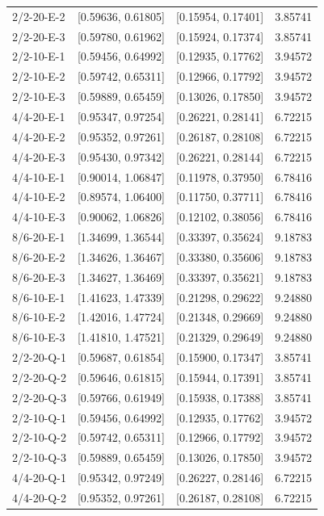 \begin{longtable}{lccr}
2/2-20-E-2 & [0.59636, 0.61805] & [0.15954, 0.17401] & 3.85741 \\
2/2-20-E-3 & [0.59780, 0.61962] & [0.15924, 0.17374] & 3.85741 \\
2/2-10-E-1 & [0.59456, 0.64992] & [0.12935, 0.17762] & 3.94572 \\
2/2-10-E-2 & [0.59742, 0.65311] & [0.12966, 0.17792] & 3.94572 \\
2/2-10-E-3 & [0.59889, 0.65459] & [0.13026, 0.17850] & 3.94572 \\
4/4-20-E-1 & [0.95347, 0.97254] & [0.26221, 0.28141] & 6.72215 \\
4/4-20-E-2 & [0.95352, 0.97261] & [0.26187, 0.28108] & 6.72215 \\
4/4-20-E-3 & [0.95430, 0.97342] & [0.26221, 0.28144] & 6.72215 \\
4/4-10-E-1 & [0.90014, 1.06847] & [0.11978, 0.37950] & 6.78416 \\
4/4-10-E-2 & [0.89574, 1.06400] & [0.11750, 0.37711] & 6.78416 \\
4/4-10-E-3 & [0.90062, 1.06826] & [0.12102, 0.38056] & 6.78416 \\
8/6-20-E-1 & [1.34699, 1.36544] & [0.33397, 0.35624] & 9.18783 \\
8/6-20-E-2 & [1.34626, 1.36467] & [0.33380, 0.35606] & 9.18783 \\
8/6-20-E-3 & [1.34627, 1.36469] & [0.33397, 0.35621] & 9.18783 \\
8/6-10-E-1 & [1.41623, 1.47339] & [0.21298, 0.29622] & 9.24880 \\
8/6-10-E-2 & [1.42016, 1.47724] & [0.21348, 0.29669] & 9.24880 \\
8/6-10-E-3 & [1.41810, 1.47521] & [0.21329, 0.29649] & 9.24880 \\
2/2-20-Q-1 & [0.59687, 0.61854] & [0.15900, 0.17347] & 3.85741 \\
2/2-20-Q-2 & [0.59646, 0.61815] & [0.15944, 0.17391] & 3.85741 \\
2/2-20-Q-3 & [0.59766, 0.61949] & [0.15938, 0.17388] & 3.85741 \\
2/2-10-Q-1 & [0.59456, 0.64992] & [0.12935, 0.17762] & 3.94572 \\
2/2-10-Q-2 & [0.59742, 0.65311] & [0.12966, 0.17792] & 3.94572 \\
2/2-10-Q-3 & [0.59889, 0.65459] & [0.13026, 0.17850] & 3.94572 \\
4/4-20-Q-1 & [0.95342, 0.97249] & [0.26227, 0.28146] & 6.72215 \\
4/4-20-Q-2 & [0.95352, 0.97261] & [0.26187, 0.28108] & 6.72215 \\

\end{longtable}
